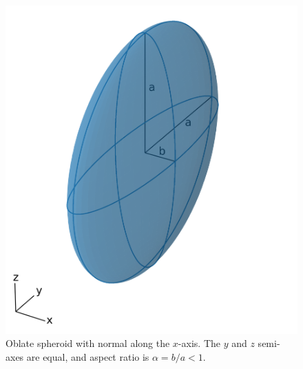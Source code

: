 \begin{figure}
    \begin{center}
    \includegraphics[width=0.5\columnwidth]{figures/phys_prop_model/ellipsoid_geometry.png}
    \end{center}
\caption{
    Oblate spheroid with normal along the $x$-axis. The $y$ and $z$ semi-axes are equal,
    and aspect ratio is $\alpha = b/a < 1$.
}
\label{fig:ellipsoid_geometry}
\end{figure}
